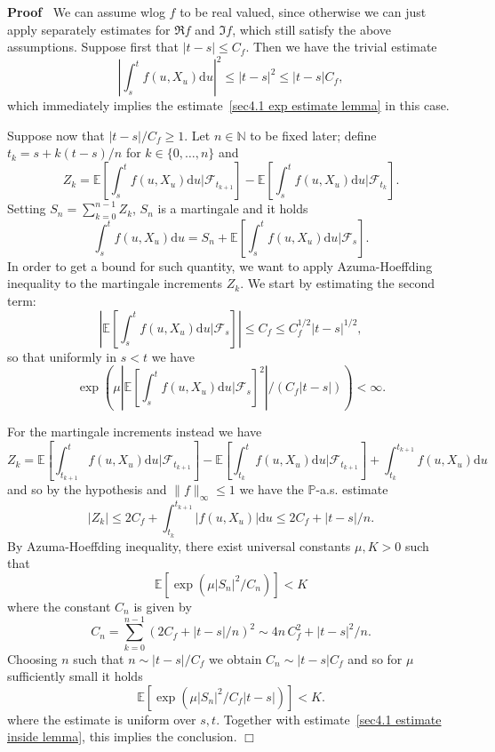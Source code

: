 \documentclass[10pt]{article}
\newcommand{\mathd}{\mathrm{d}}
\newcommand{\nobracket}{}
\newenvironment{proof}{\noindent\textbf{Proof\ }}{\hspace*{\fill}$\Box$\medskip}
\begin{document}
\begin{proof}
  We can assume wlog $f$ to be real valued, since otherwise we can just apply
  separately estimates for $\Re f$ and $\Im f$, which still satisfy the above
  assumptions. Suppose first that $| t - s | \leqslant C_f$. Then we have the
  trivial estimate
  \[ \left| \int_s^t f (u, X_u) \mathd u \right|^2 \leqslant | t - s |^2
     \leqslant | t - s | C_f, \]
  which immediately implies the estimate~{\eqref{sec4.1 exp estimate lemma}}
  in this case.
  
  Suppose now that $| t - s | / C_f^{} \geqslant 1$. Let $n \in \mathbb{N}$ to
  be fixed later; define $t_k = s + k (t - s) / n$ for $k \in \{ 0, \ldots, n
  \}$ and
  \[ Z_k =\mathbb{E} \left[ \int_s^t f (u, X_u) \mathd u | \mathcal{F}_{t_{k
     + 1}} \nobracket \right] -\mathbb{E} \left[ \int_s^t f (u, X_u) \mathd u
     | \mathcal{F}_{t_k} \nobracket \right] . \]
  Setting $S_n = \sum_{k = 0}^{n - 1} Z_k$, $S_n$ is a martingale and it holds
  \[ \int_s^t f (u, X_u) \mathd u = S_n +\mathbb{E} \left[ \int_s^t f (u, X_u)
     \mathd u | \mathcal{F}_s \nobracket \right] . \]
  In order to get a bound for such quantity, we want to apply
  Azuma\mbox{-}Hoeffding inequality to the martingale increments $Z_k$. We
  start by estimating the second term:
  \[ \left| \mathbb{E} \left[ \int_s^t f (u, X_u) \mathd u | \mathcal{F}_s
     \nobracket \right] \right| \leqslant C_f \leqslant C_f^{1 / 2} | t - s
     |^{1 / 2}, \]
  so that uniformly in $s < t$ we have
  \begin{equation}
    \exp \left( \mu \left| \mathbb{E} \left[ \int_s^t f (u, X_u) \mathd u |
    \mathcal{F}_s \nobracket \right]^2 \right| / (C_f | t - s |) \right) <
    \infty . \label{sec4.1 estimate inside lemma}
  \end{equation}
  
  
  For the martingale increments instead we have
  \[ Z_k =\mathbb{E} \left[ \int_{t_{k + 1}}^t f (u, X_u) \mathd u |
     \mathcal{F}_{t_{k + 1}} \nobracket \right] -\mathbb{E} \left[
     \int_{t_k}^t f (u, X_u) \mathd u | \mathcal{F}_{t_{k + 1}} \nobracket
     \right] + \int_{t_k}^{t_{k + 1}} f (u, X_u) \mathd u \]
  and so by the hypothesis and $\| f \|_{\infty} \leqslant 1$ we have the
  $\mathbb{P}$-a.s. estimate
  \[ | Z_k | \leqslant 2 C_f + \int_{t_k}^{t_{k + 1}} | f (u, X_u) | \mathd u
     \leqslant 2 C_f + | t - s | / n. \]
  By Azuma\mbox{-}Hoeffding inequality, there exist universal constants $\mu,
  K > 0$ such that
  \[ \mathbb{E} [\exp (\mu | S_n |^2 / C_n)] < K \]
  where the constant $C_n$ is given by
  \[ C_n = \sum_{k = 0}^{n - 1} (2 C_f + | t - s | / n)^2 \sim 4 n \, C_f^2 +
     | t - s |^2 / n. \]
  Choosing $n$ such that $n \sim | t - s | / C_f$ we obtain $C_n \sim | t - s
  | C_f$ and so for $\mu$ sufficiently small it holds
  \[ \mathbb{E} [\exp (\mu | S_n |^2 / C_f | t - s |)] < K. \]
  where the estimate is uniform over $s, t$. Together with
  estimate~{\eqref{sec4.1 estimate inside lemma}}, this implies the
  conclusion.
\end{proof}
\end{document}
